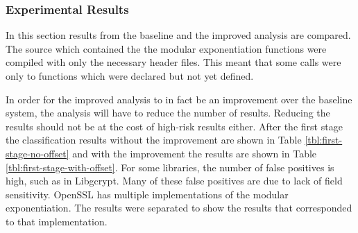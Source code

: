 \documentclass[11pt,a4paper]{article}
\begin{document}
\subsubsection{Experimental Results}

In this section results from the baseline and the improved analysis are
compared. The source which contained the the modular exponentiation functions
were compiled with only the necessary header files. This meant that some
calls were only to functions which were declared but not yet defined.

In order for the improved analysis to in fact be an improvement over the
baseline system, the analysis will have to reduce the number of results.
Reducing the results should not be at the cost of high-risk results either.
After the first stage the classification results without the improvement are
shown in Table \ref{tbl:first-stage-no-offset} and with the improvement the
results are shown in Table \ref{tbl:first-stage-with-offset}. For some
libraries, the number of false positives is high, such as in Libgcrypt. Many of
these false positives are due to lack of field sensitivity. OpenSSL has multiple
implementations of the modular exponentiation. The results were separated to
show the results that corresponded to that implementation.

\begin{table}
  \centering
  \caption{Stage 1 Classification - Field Insensitive (Baseline) Analysis: TP - True Positive, FP - False Positive, V - Validation, LR - Low-Risk, HR - High-Risk}
  \label{tbl:first-stage-no-offset}
\end{table}
\end{document}
